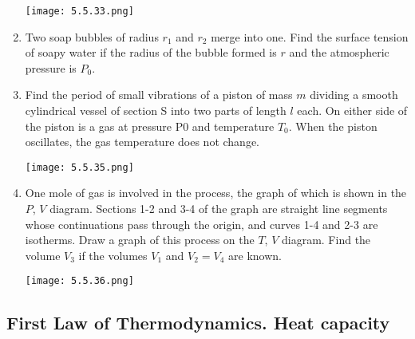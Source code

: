 \documentclass{article}
\begin{document}
\begin{enumerate}[label=5.5.\arabic*]
\begin{center}
    \texttt{[image: 5.5.33.png]}
\end{center}


\item Two soap bubbles of radius $r_1$ and $r_2$ merge into one. Find the surface tension of soapy water if the radius of the bubble formed is $r$ and the atmospheric pressure is $P_0$.

\item Find the period of small vibrations of a piston of mass $m$ dividing a smooth cylindrical vessel of section S into two parts of length $l$ each. On either side of the piston is a gas at pressure P0 and temperature $T_0$. When the piston oscillates, the gas temperature does not change.

\begin{center}
    \texttt{[image: 5.5.35.png]}
\end{center}


\item One mole of gas is involved in the process, the graph of which is shown in the $P$, $V$ diagram. Sections 1-2 and 3-4 of the graph are straight line segments whose continuations pass through the origin, and curves 1-4 and 2-3 are isotherms. Draw a graph of this process on the $T$, $V$ diagram. Find the volume $V_3$ if the volumes $V_1$ and $V_2 = V_4$ are known.

\begin{center}
    \texttt{[image: 5.5.36.png]}
\end{center}








\end{enumerate}

\subsection{First Law of Thermodynamics. Heat capacity}
\end{document}
